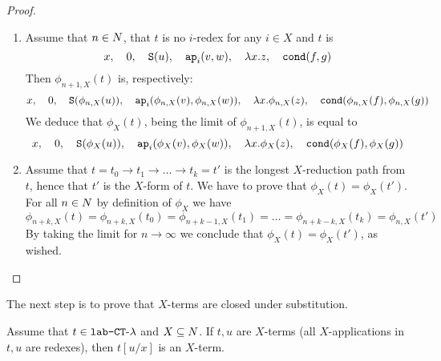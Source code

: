 \begin{proof}
\begin{enumerate}

\item
Assume that $n \in {N}$, that $t$ is no $i$-redex for any $i \in X$ and $t$ is
$$ 
x, \ \ \  
0, \ \ \  
{\tt S}(u),  \ \ \  
{\tt ap}_i(v,w), \ \ \  
\lambda x.z, \ \ \  
{\tt cond}(f,g)
$$
Then $\phi_{n+1,X}(t)$ is, respectively:
$$ 
x, \ \ \  
0, \ \ \  
{\tt S}(\phi_{n,X}(u)),  \ \ \  
{\tt ap}_i(\phi_{n,X}(v),\phi_{n,X}(w)), \ \ \  
\lambda x.\phi_{n,X}(z), \ \ \  
{\tt cond}(\phi_{n,X}(f),\phi_{n,X}(g))
$$
We deduce that $\phi_X(t)$, being the limit of $\phi_{n+1,X}(t)$, is equal to
$$ 
x, \ \ \  
0, \ \ \  
{\tt S}(\phi_X(u)),  \ \ \  
{\tt ap}_i(\phi_X(v),\phi_X(w)), \ \ \  
\lambda x.\phi_X(z), \ \ \  
{\tt cond}(\phi_X(f),\phi_X(g))
$$
 

\item
Assume that $t=t_0 \rightarrow t_1 \rightarrow \ldots \rightarrow t_k = t'$ 
is  the longest $X$-reduction path from $t$, hence that $t'$ is the $X$-form of $t$. 
We have to prove that $\phi_X(t) = \phi_X(t')$.
For all $n \in {N}$ by definition of $\phi_X$ we have 
$$
\phi_{n+k,X} (t) = 
\phi_{n+k,X} (t_0) = 
\phi_{n+k-1,X} (t_1) = 
\ldots = 
\phi_{n+k-k,X} (t_k) 
= \phi_{n,X} (t')
$$
By taking the limit for $n \rightarrow \infty$ 
we conclude that $\phi_X(t) = \phi_X(t')$, as wished.

\end{enumerate}
\end{proof}

The next step is to prove that $X$-terms are closed under substitution.



\begin{lemma}
Assume that $t \in {\mbox{\tt lab-} { {\tt CT}\mbox{-}\lambda} }$ and $X \subseteq {N}$.
If $t,u$ are $X$-terms (all $X$-applications in $t,u$ are redexes), then $t[u/x]$ is an $X$-term.
\end{lemma}

